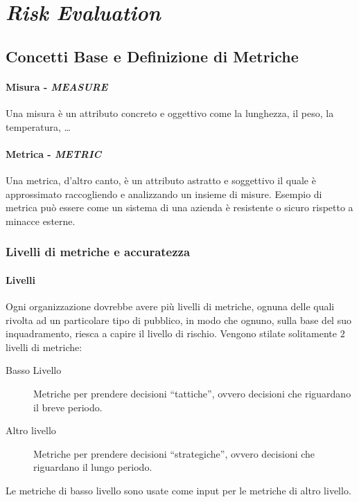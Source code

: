 \section{\textit{Risk Evaluation}}
    \subsection{Concetti Base e Definizione di Metriche}
        \paragraph{Misura - \textit{MEASURE}}
            Una misura è un attributo concreto e oggettivo come la lunghezza, il peso, la temperatura, \dots
        \paragraph{Metrica - \textit{METRIC}}
            Una metrica, d'altro canto, è un attributo astratto e soggettivo il quale è approssimato raccogliendo e analizzando un insieme di misure. Esempio di metrica può essere come un sistema di una azienda è resistente o sicuro rispetto a minacce esterne.
        \subsubsection{Livelli di metriche e accuratezza} 
            \paragraph{Livelli} 
                Ogni organizzazione dovrebbe avere più livelli di metriche, ognuna delle quali rivolta ad un particolare tipo di pubblico, in modo che ognuno, sulla base del suo inquadramento, riesca a capire il livello di rischio. Vengono stilate solitamente $2$ livelli di metriche: 
                \begin{description}
                    \item[Basso Livello] Metriche per prendere decisioni ``tattiche'', ovvero decisioni che riguardano il breve periodo.
                    \item[Altro livello] Metriche per prendere decisioni ``strategiche'', ovvero decisioni che riguardano il lungo periodo.
                \end{description}
                Le metriche di basso livello sono usate come input per le metriche di altro livello.
